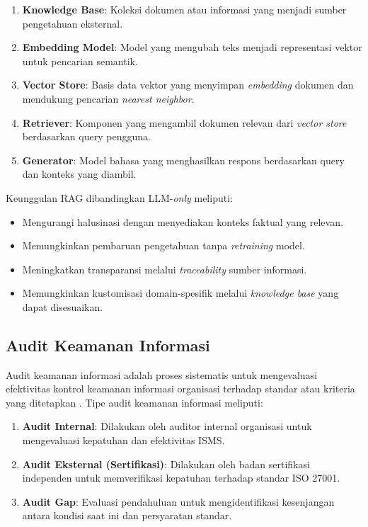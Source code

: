\documentclass[bachelor,bahasa]{thesisdtetiugm}
\begin{document}
\begin{enumerate}
	\item \textbf{Knowledge Base}: Koleksi dokumen atau informasi yang menjadi sumber pengetahuan eksternal.
	\item \textbf{Embedding Model}: Model yang mengubah teks menjadi representasi vektor untuk pencarian semantik.
	\item \textbf{Vector Store}: Basis data vektor yang menyimpan \textit{embedding} dokumen dan mendukung pencarian \textit{nearest neighbor}.
	\item \textbf{Retriever}: Komponen yang mengambil dokumen relevan dari \textit{vector store} berdasarkan query pengguna.
	\item \textbf{Generator}: Model bahasa yang menghasilkan respons berdasarkan query dan konteks yang diambil.
\end{enumerate}

Keunggulan RAG dibandingkan LLM-\textit{only} meliputi:
\begin{itemize}
	\item Mengurangi halusinasi dengan menyediakan konteks faktual yang relevan.
	\item Memungkinkan pembaruan pengetahuan tanpa \textit{retraining} model.
	\item Meningkatkan transparansi melalui \textit{traceability} sumber informasi.
	\item Memungkinkan kustomisasi domain-spesifik melalui \textit{knowledge base} yang dapat disesuaikan.
\end{itemize}

\subsection{Audit Keamanan Informasi}

Audit keamanan informasi adalah proses sistematis untuk mengevaluasi efektivitas kontrol keamanan informasi organisasi terhadap standar atau kriteria yang ditetapkan \cite{csam2024}. Tipe audit keamanan informasi meliputi:

\begin{enumerate}
	\item \textbf{Audit Internal}: Dilakukan oleh auditor internal organisasi untuk mengevaluasi kepatuhan dan efektivitas ISMS.
	\item \textbf{Audit Eksternal (Sertifikasi)}: Dilakukan oleh badan sertifikasi independen untuk memverifikasi kepatuhan terhadap standar ISO 27001.
	\item \textbf{Audit Gap}: Evaluasi pendahuluan untuk mengidentifikasi kesenjangan antara kondisi saat ini dan persyaratan standar.
\end{enumerate}
\end{document}
